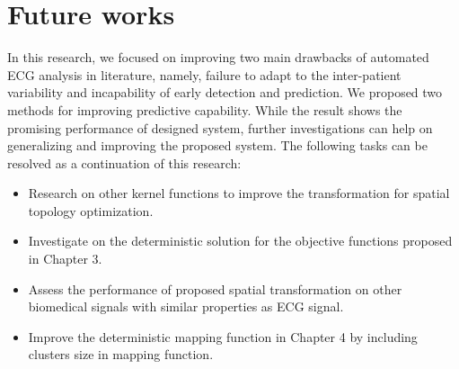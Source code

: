 \section{Future works}
In this research, we focused on improving two main drawbacks of automated ECG analysis in literature, namely, failure to adapt to the inter-patient variability and incapability of early detection and prediction. We proposed two methods for improving predictive capability. While the result shows the promising performance of designed system, further investigations can help on generalizing and improving the proposed system. The following tasks can be resolved as a continuation of this research:
 \begin{itemize}
\item Research on other kernel functions to improve the transformation for spatial topology optimization.
\item Investigate on the deterministic solution for the objective functions proposed in Chapter 3.
\item Assess the performance of proposed spatial transformation on other biomedical signals with similar properties as ECG signal.
\item  Improve the deterministic mapping function in Chapter 4 by including clusters size in mapping function.
\end{itemize}


